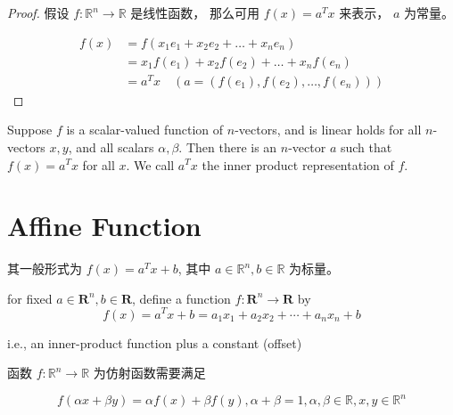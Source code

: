 \begin{proof}
    假设 $ f: \mathbb{R}^{n} \rightarrow \mathbb{R} $ 是线性函数， 那么可用 $ f(x)=a^{T} x $ 来表示， $ a $ 为常量。

    \begin{equation} \begin{aligned} f(x) &=f\left(x_{1} e_{1}+x_{2} e_{2}+\ldots+x_{n} e_{n}\right) \\ &=x_{1} f\left(e_{1}\right)+x_{2} f\left(e_{2}\right)+\ldots+x_{n} f\left(e_{n}\right) \\ & = a^Tx \quad (a = ( f\left(e_{1}\right), f\left(e_{2}\right), \ldots, f\left(e_{n}\right) )) \end{aligned} \end{equation}
\end{proof}

\begin{definition}
    Suppose $ f $ is a scalar-valued function of $ n $-vectors, and is linear  holds for all $ n $-vectors $ x, y $, and all scalars $ \alpha, \beta $. Then there is an $ n $-vector $ a $ such that $ f(x)=a^{T} x $ for all $ x $. We call $ a^{T} x $ the inner product representation of $ f $.
\end{definition}

\section{Affine Function}


\begin{definition}
    其一般形式为 $ f(x)=a^{T} x+{b} $, 其中 $ a \in \mathbb{R}^{n}, b \in \mathbb{R} $ 为标量。 

    
        for fixed $ a \in \mathbf{R}^{n}, b \in \mathbf{R} $, define a function $ f: \mathbf{R}^{n} \rightarrow \mathbf{R} $ by
    \begin{equation}
    f(x)=a^{T} x+b=a_{1} x_{1}+a_{2} x_{2}+\cdots+a_{n} x_{n}+b
    \end{equation}
    
    i.e., an inner-product function plus a constant (offset)
    
\end{definition}

\begin{theorem}
    函数 $ f: \mathbb{R}^{n} \rightarrow \mathbb{R} $ 为仿射函数需要满足

\begin{equation} f(\alpha x+\beta y)=\alpha f(x)+\beta f(y), \alpha+\beta=1, \alpha, \beta \in \mathbb{R}, x, y \in \mathbb{R}^{n} \end{equation}
\end{theorem}

